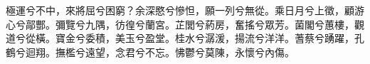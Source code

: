 
\begin{pinyinscope}
極運兮不中，來將屈兮困窮？余深愍兮慘怛，願一列兮無從。乘日月兮上徵，顧游心兮鄗酆。彌覽兮九隅，彷徨兮蘭宮。芷閭兮葯房，奮搖兮眾芳。菌閣兮蕙樓，觀道兮從橫。寶金兮委積，美玉兮盈堂。桂水兮潺湲，揚流兮洋洋。蓍蔡兮踴躍，孔鶴兮迴翔。撫檻兮遠望，念君兮不忘。怫鬱兮莫陳，永懷兮內傷。


\end{pinyinscope}